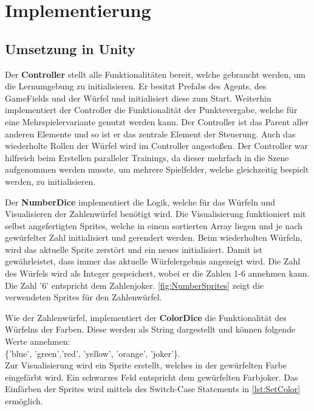 

\clearpage
\chapter{Implementierung}
\section{Umsetzung in Unity}
Der \textbf{Controller} stellt alle Funktionalitäten bereit, welche gebraucht werden, um die Lernumgebung zu initialisieren.
Er besitzt Prefabs des Agents, des GameFields und der Würfel und initialisiert diese zum Start.
Weiterhin implementiert der Controller die Funktionalität der Punktevergabe, welche für eine Mehrspielervariante genutzt werden kann.
Der Controller ist das Parent aller anderen Elemente und so ist er das zentrale Element der Steuerung. Auch das wiederholte Rollen der Würfel wird im Controller angestoßen.
Der Controller war hilfreich beim Erstellen paralleler Trainings, da dieser mehrfach in die Szene aufgenommen werden musste, um mehrere Spielfelder, welche gleichzeitig bespielt werden, zu initialisieren.

Der \textbf{NumberDice} implementiert die Logik, welche für das Würfeln und Visualisieren der Zahlenwürfel benötigt wird.
Die Visualisierung funktioniert mit selbst angefertigten Sprites, welche in einem sortierten Array liegen und je nach gewürfelter Zahl initialisiert und gerendert werden.
Beim wiederholten Würfeln, wird das aktuelle Sprite zerstört und ein neues initialisiert.
Damit ist gewährleistet, dass immer das aktuelle Würfelergebnis angezeigt wird.
Die Zahl des Würfels wird als Integer gespeichert, wobei er die Zahlen 1-6 annehmen kann.
Die Zahl '6' entspricht dem Zahlenjoker. \ref{fig:NumberSprites} zeigt die verwendeten Sprites für den Zahlenwürfel. 

\newpage
Wie der Zahlenwürfel, implementiert der \textbf{ColorDice} die Funktionalität des Würfelns der Farben.
Diese werden als String dargestellt und können folgende Werte annehmen:\\ \{'blue', 'green','red', 'yellow', 'orange', 'joker'\}.\\
Zur Visualisierung wird ein Sprite erstellt, welches in der gewürfelten Farbe eingefärbt wird. Ein schwarzes Feld entspricht dem gewürfelten Farbjoker.
Das Einfärben der Sprites wird mittels des Switch-Case Statements in \ref{lst:SetColor} ermöglich. 


